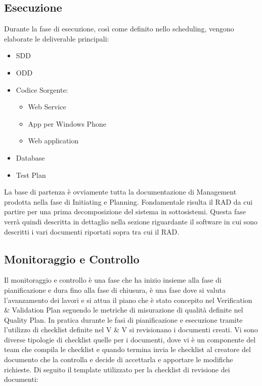 \subsection{Esecuzione}
Durante la fase di esecuzione, cos\`{i} come definito nello scheduling, vengono elaborate le deliverable principali:\\
\begin{itemize}
\item SDD
\item ODD
\item Codice Sorgente:
\begin{itemize}
\item Web Service
\item App per Windows Phone
\item Web application
\end{itemize}
\item Database
\item Test Plan
\end{itemize}
La base di partenza \`{e} ovviamente tutta la documentazione di Management prodotta nella fase di Initiating e Planning. Fondamentale risulta il RAD da cui partire per una prima decomposizione del sistema in sottosistemi.
Questa fase verr\`{a} quindi descritta in dettaglio nella sezione riguardante il software in cui sono descritti i vari documenti riportati sopra tra cui il RAD.


\subsection{Monitoraggio e Controllo}
Il monitoraggio e controllo \`{e} una fase che ha inizio insieme alla fase di pianificazione e dura fino alla fase di chiusura, \`{e} una fase dove si valuta l\rq avanzamento dei lavori e si attua il piano che \`{e} stato concepito nel Verification \& Validation Plan seguendo le metriche di misurazione di qualit\`{a} definite nel Quality Plan. In pratica durante le fasi di pianificazione e esecuzione tramite l\rq utilizzo di checklist definite nel V \& V si revisionano i documenti creati. Vi sono diverse tipologie di checklist quelle per i documenti, dove vi \`{e} un componente del team che compila le checklist e quando termina invia le checklist al creatore del documento che la controlla e decide di accettarla e apportare le modifiche richieste. Di seguito il template utilizzato per la checklist di revisione dei documenti:\\

